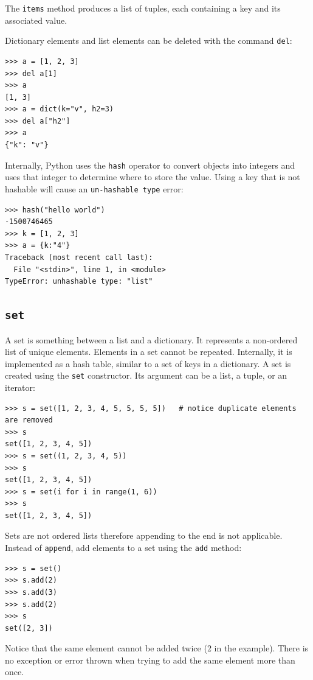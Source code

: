 \documentclass[justified, sixbynine]{tufte-book}
\def\ft{\small\tt}
\theoremstyle{plain}%
\newtheorem * {corollary}{Corollary}
\theoremstyle{definition}
\theoremstyle{remark}
\newtheorem * {remark}{Remark}
\newtheorem * {note}{Note}
\begin{document}
\begin{fullwidth}
The {\ft items} method produces a list of tuples, each containing a key and its associated value.

Dictionary elements and list elements can be deleted with the command {\ft del}:
\begin{lstlisting}
>>> a = [1, 2, 3]
>>> del a[1]
>>> a
[1, 3]
>>> a = dict(k="v", h2=3)
>>> del a["h2"]
>>> a
{"k": "v"}
\end{lstlisting}

Internally, Python uses the {\ft hash} operator to convert objects into integers and uses that integer to determine where to store the value.  Using a key that is not hashable will cause an {\ft un-hashable type} error:
\begin{lstlisting}
>>> hash("hello world")
-1500746465
>>> k = [1, 2, 3]
>>> a = {k:"4"}
Traceback (most recent call last):
  File "<stdin>", line 1, in <module>
TypeError: unhashable type: "list"
\end{lstlisting}

\goodbreak\subsection{{\ft set}}


A set is something between a list and a dictionary. It represents a non-ordered list of unique elements.  Elements in a set cannot be repeated.  Internally, it is implemented as a hash table, similar to a set of keys in a dictionary.  A set is created using the {\ft set} constructor.  Its argument can be a list, a tuple, or an iterator:

\begin{lstlisting}
>>> s = set([1, 2, 3, 4, 5, 5, 5, 5])   # notice duplicate elements are removed
>>> s
set([1, 2, 3, 4, 5])
>>> s = set((1, 2, 3, 4, 5))
>>> s
set([1, 2, 3, 4, 5])
>>> s = set(i for i in range(1, 6))
>>> s
set([1, 2, 3, 4, 5])
\end{lstlisting}

Sets are not ordered lists therefore appending to the end is not applicable.  Instead of {\ft append}, add elements to a set using the {\ft add} method:

\begin{lstlisting}
>>> s = set()
>>> s.add(2)
>>> s.add(3)
>>> s.add(2)
>>> s
set([2, 3])
\end{lstlisting}

Notice that the same element cannot be added twice (2 in the example). There is no exception or error thrown when trying to add the same element more than once.


\end{fullwidth}
\end{document}
